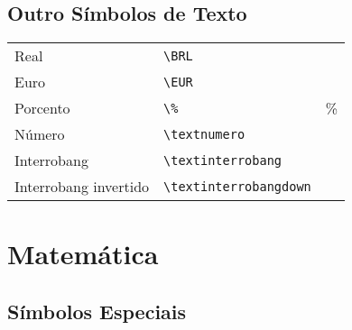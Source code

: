 \documentclass{gjvnq-livreto}
\begin{document}
\subsection{Outro Símbolos de Texto}
\begin{codeBox}
\begin{longtable}{lll}
Real & \verb|\BRL| & \BRL \\
Euro & \verb|\EUR| & \EUR \\
Porcento & \verb|\%| & \% \\
Número & \verb|\textnumero| & \textnumero \\
Interrobang & \verb|\textinterrobang| & \textinterrobang \\
Interrobang invertido & \verb|\textinterrobangdown| & \textinterrobangdown \\
\end{longtable}
\end{codeBox}

\section{Matemática}



\subsection{Símbolos Especiais}
\end{document}
